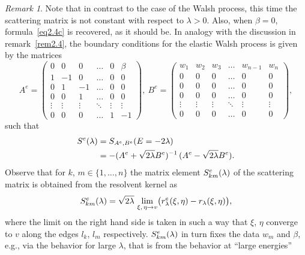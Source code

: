 \documentclass[11pt,a4paper]{amsart}
\newcommand{\gb}{\beta}
\newcommand{\gl}{\lambda}
\newcommand{\1}{1}
\theoremstyle{remark}
\newtheorem{remark}[theorem]{Remark}
\newcommand{\sgl}{\ensuremath\sqrt{2\gl}}
\newcommand{\reW}{\ensuremath r^e}
\newcommand{\SeW}{\ensuremath S^e}
\numberwithin{equation}{section}
\begin{document}
\begin{remark}  \label{rem3.5}
Note that in contrast to the case of the Walsh process, this time the scattering
matrix is not constant with respect to $\gl>0$. Also, when $\gb=0$,
formula~\eqref{eq2.4c} is recovered, as it should be. In analogy with the discussion
in remark~\ref{rem2.4}, the boundary conditions for the elastic Walsh process is
given by the matrices
\begin{equation*}
    A^e = \begin{pmatrix}
             0&0&0&\ldots&0&\gb\\
             1&-1&0&\ldots&0&0\\
             0&1&-1&\ldots&0&0\\
             0&0&1&\ldots &0&0\\
             \vdots&\vdots&\vdots&\ddots&\vdots&\vdots\\
             0&0&0&\ldots&1&-1
         \end{pmatrix},\ %
    B^e=\begin{pmatrix}
            w_1&w_2&w_3&\ldots&w_{n-1}&w_n\\
            0&0&0&\ldots&0&0\\
            0&0&0&\ldots&0&0\\
            0&0&0&\ldots&0&0\\
            \vdots&\vdots&\vdots&\ddots&\vdots&\vdots\\
            0&0&0&\ldots&0&0
        \end{pmatrix},
\end{equation*}
such that
\begin{align*}
    \SeW(\gl) &= S_{A^e,B^e}(E=-2\gl)\\
              &= - (A^e+\sgl B^e)^{-1}\,(A^e-\sgl B^e).
\end{align*}
Observe that for $k$, $m\in\{1,\dotsc,n\}$ the matrix element $\SeW_{km}(\gl)$
of the scattering matrix is obtained from the resolvent kernel as
\begin{equation*}
    \SeW_{km}(\gl)
        = \sgl\,\lim_{\xi,\,\eta\to v}\bigl(\reW_\gl(\xi,\eta) - r_\gl(\xi,\eta)\bigr),
\end{equation*}
where the limit on the right hand side is taken in such a way that $\xi$, $\eta$ converge
to $v$ along the edges $l_k$, $l_m$ respectively. $\SeW_{km}(\gl)$ in turn fixes the
data $w_m$ and $\gb$, e.g., via the behavior for large $\gl$, that is from the behavior
at ``large energies''
\begin{equation*}

\end{equation*}
\end{remark}
\end{document}
